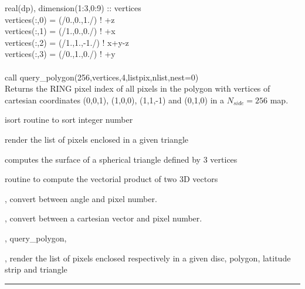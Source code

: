 \begin{example}
{
real(dp), dimension(1:3,0:9) :: vertices \\
vertices(:,0) = (/0.,0.,1./)  ! +z \\
vertices(:,1) = (/1.,0.,0./)  ! +x \\
vertices(:,2) = (/1.,1.,-1./) ! x+y-z \\
vertices(:,3) = (/0.,1.,0./)  ! +y \\
 \\
call query\_polygon(256,vertices,4,listpix,nlist,nest=0)  \\
}
{
Returns the RING pixel index of all pixels in the polygon with vertices of
cartesian coordinates (0,0,1), (1,0,0), (1,1,-1) and (0,1,0) in a $N_{side}=256$ map.
}
\end{example}
\begin{modules}
  \begin{sulist}{} %
 \item[isort] routine to sort integer number
 \item[\htmlref{query\_triangle}{sub:query_triangle}] render the list of pixels enclosed
  in a given triangle
 \item[\htmlref{surface\_triangle}{sub:surface_triangle}] computes the surface of a spherical triangle defined by 3 vertices
 \item[\htmlref{vect\_prod}{sub:vect_prod}] routine to compute the vectorial product of two 3D vectors
  \end{sulist}
\end{modules}

\begin{related}
  \begin{sulist}{} %
  \item[\htmlref{pix2ang}{sub:pix_tools}, \htmlref{ang2pix}{sub:pix_tools}] convert between angle and pixel number.
  \item[\htmlref{pix2vec}{sub:pix_tools}, \htmlref{vec2pix}{sub:pix_tools}] convert between a cartesian vector and pixel number.
  \item[\htmlref{query\_disc}{sub:query_disc}, query\_polygon,]
  \item[\htmlref{query\_strip}{sub:query_strip}, \htmlref{query\_triangle}{sub:query_triangle}] render the list of pixels enclosed
  respectively in a given disc, polygon, latitude strip and triangle

  \end{sulist}
\end{related}

\rule{\hsize}{2mm}

\newpage
